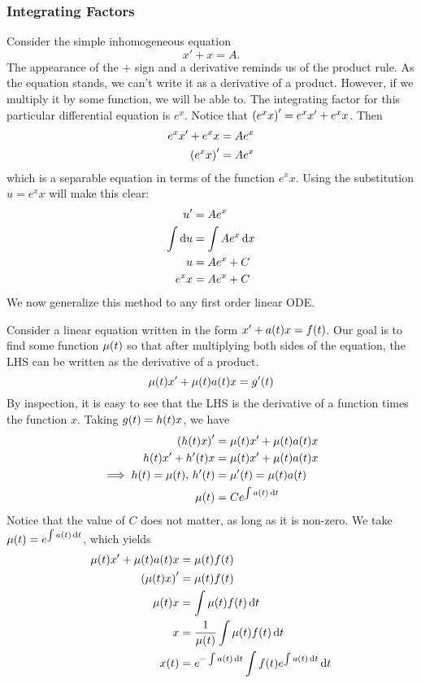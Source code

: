 \subsubsection{Integrating Factors}
Consider the simple inhomogeneous equation \[ x' + x = A. \] The appearance of the $+$ sign and a derivative reminds us of the product rule. As the equation stands, we can't write it as a derivative of a product. However, if we multiply it by some function, we will be able to. The integrating factor for this particular differential equation is $e^x$. Notice that $\p{e^x x}' = e^x x' + e^x x$. Then
\begin{align*}
	e^x x' + e^x x &= Ae^x \\
	\p{e^x x}' &= Ae^x
\end{align*}
which is a separable equation in terms of the function $e^x x$. Using the substitution $u = e^x x$ will make this clear:
\begin{align*}
	u' &= Ae^x \\
	\int \mathrm{d}u &= \int Ae^x \, \mathrm{d}x \\
	u &= Ae^x + C \\
	e^x x &= Ae^x + C
\end{align*}
We now generalize this method to any first order linear ODE.
\par\bigskip
Consider a linear equation written in the form $x' + a\p{t}x = f\p{t}$. Our goal is to find some function $\mu\p{t}$ so that after multiplying both sides of the equation, the LHS can be written as the derivative of a product.
\[ \mu\p{t} x' + \mu\p{t} a\p{t}x = g'\p{t} \]
By inspection, it is easy to see that the LHS is the derivative of a function times the function $x$. Taking $g\p{t} = h\p{t}x$, we have
\begin{align*}
	\p{h\p{t}x}' &= \mu\p{t} x' + \mu\p{t} a\p{t}x \\
	h\p{t}x' + h'\p{t}x &= \mu\p{t} x' + \mu\p{t} a\p{t}x \\
	\implies h\p{t} = \mu\p{t}, \, h'\p{t} &= \mu'\p{t} = \mu\p{t} a\p{t} \\
	\mu\p{t} &= Ce^{\int a\p{t} \, \diff{t}}
\end{align*}
Notice that the value of $C$ does not matter, as long as it is non-zero. We take $\mu\p{t} = e^{\int a\p{t} \, \diff{t}}$, which yields
\begin{align*}
	\mu\p{t} x' + \mu\p{t} a\p{t}x &= \mu\p{t} f\p{t} \\
	\p{\mu\p{t} x}' &= \mu\p{t} f\p{t} \\
	\mu\p{t} x &= \int \mu\p{t} f\p{t} \, \diff{t} \\
	x &= \frac{1}{\mu\p{t}} \int \mu\p{t} f\p{t} \, \diff{t} \\
	x\p{t} &= e^{-\int a\p{t} \, \diff{t}} \int f\p{t} e^{\int a\p{t} \, \diff{t}} \, \diff{t}
\end{align*}
